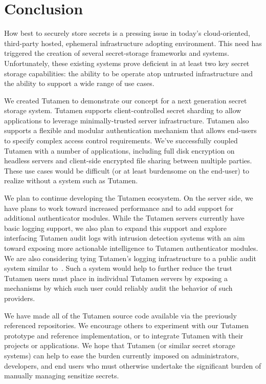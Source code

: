 \section{Conclusion}
\label{sec:conclusion}

How best to securely store secrets is a pressing issue in today's
cloud-oriented, third-party hosted, ephemeral infrastructure adopting
environment. This need has triggered the creation of several
secret-storage frameworks and systems. Unfortunately, these existing
systems prove deficient in at least two key secret storage
capabilities: the ability to be operate atop untrusted infrastructure
and the ability to support a wide range of use cases.

We created Tutamen to demonstrate our concept for a next generation
secret storage system. Tutamen supports client-controlled secret
sharding to allow applications to leverage minimally-trusted server
infrastructure. Tutamen also supports a flexible and modular
authentication mechanism that allows end-users to specify complex
access control requirements. We've successfully coupled Tutamen with a
number of applications, including full disk encryption on headless
servers and client-side encrypted file sharing between multiple
parties. These use cases would be difficult (or at least burdensome on
the end-user) to realize without a system such as Tutamen.

We plan to continue developing the Tutamen ecosystem. On the server
side, we have plans to work toward increased performance and to add
support for additional authenticator modules. While the Tutamen
servers currently have basic logging support, we also plan to expand
this support and explore interfacing Tutamen audit logs with intrusion
detection systems with an aim toward exposing more actionable
intelligence to Tutamen authenticator modules. We are also considering
tying Tutamen's logging infrastructure to a public audit system
similar to~\cite{laurie2013}. Such a system would help to further
reduce the trust Tutamen users must place in individual Tutamen
servers by exposing a mechanisms by which such user could reliably
audit the behavior of such providers.

We have made all of the Tutamen source code available via the
previously referenced repositories. We encourage others to experiment
with our Tutamen prototype and reference implementation, or to
integrate Tutamen with their projects or applications. We hope that
Tutamen (or similar secret storage systems) can help to ease the
burden currently imposed on administrators, developers, and end users
who must otherwise undertake the significant burden of manually
managing sensitize secrets.

